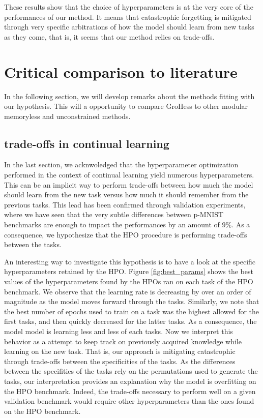 \documentclass[11pt]{article}
\begin{document}
\vspace{1mm}
\noindent
These results show that the choice of hyperparameters is at the very core of the performances of our method. It means that catastrophic forgetting is mitigated through very specific arbitrations of how the model should learn from new tasks as they come, that is, it seems that our method relies on trade-offs.



\section{Critical comparison to literature}



In the following section, we will develop remarks about the methods fitting with our hypothesis. This will a opportunity to compare GroHess to other modular memoryless and unconstrained methods. 


\subsection{trade-offs in continual learning}


In the last section, we acknwoledged that the hyperparameter optimization performed in the context of continual learning yield numerous hyperparameters. This can be an implicit way to perform trade-offs between how much the model should learn from the new task versus how much it should remember from the previous tasks. This lead has been confirmed through validation experiments, where we have seen that the very subtle differences between p-MNIST benchmarks are enough to impact the performances by an amount of $9\%$. As a consequence, we hypothesize that the HPO procedure is performing trade-offs between the tasks.

\vspace{2mm}
\noindent
An interesting way to investigate this hypothesis is to have a look at the specific hyperparameters retained by the HPO. Figure \ref{fig:best_params} shows the best values of the hyperparameters found by the HPOs ran on each task of the HPO benchmark. We observe that the learning rate is decreasing by over an order of magnitude as the model moves forward through the tasks. Similarly, we note that the best number of epochs used to train on a task was the highest allowed for the first tasks, and then quickly decreased for the latter tasks. As a consequence, the model model is learning less and less of each tasks. Now we interpret this behavior as a attempt to keep track on previously acquired knowledge while learning on the new task. That is, our approach is mitigating catastrophic through trade-offs between the specificities of the tasks. As the differences between the specifities of the tasks rely on the permutations used to generate the tasks, our interpretation provides an explanation why the model is overfitting on the HPO benchmark. Indeed, the trade-offs necessary to perform well on a given validation benchmark would require other hyperparameters than the ones found on the HPO benchmark.
\end{document}
